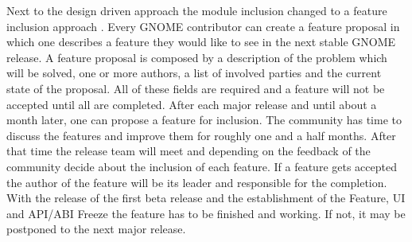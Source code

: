Next to the design driven approach the module inclusion changed to a feature
inclusion approach \cite{GNOMEFeatures3.4,GNOMERoadMap}. Every GNOME
contributor can create a feature proposal in which one describes a feature they
would like to see in the next stable GNOME release. A feature proposal is
composed by a description of the problem which will be solved, one or more
authors, a list of involved parties and the current state of the proposal. All
of these fields are required and a feature will not be accepted until all are
completed. After each major release and until about a month later, one can
propose a feature for inclusion. The community has time to discuss the features
and improve them for roughly one and a half months. After that time the release
team will meet and depending on the feedback of the community decide about the
inclusion of each feature. If a feature gets accepted the author of the feature
will be its leader and responsible for the completion. With the release of the
first beta release and the establishment of the Feature, \ac{UI} and
\ac{API}/\acs{ABI} Freeze the feature has to be finished and working. If not,
it may be postponed to the next major release.


